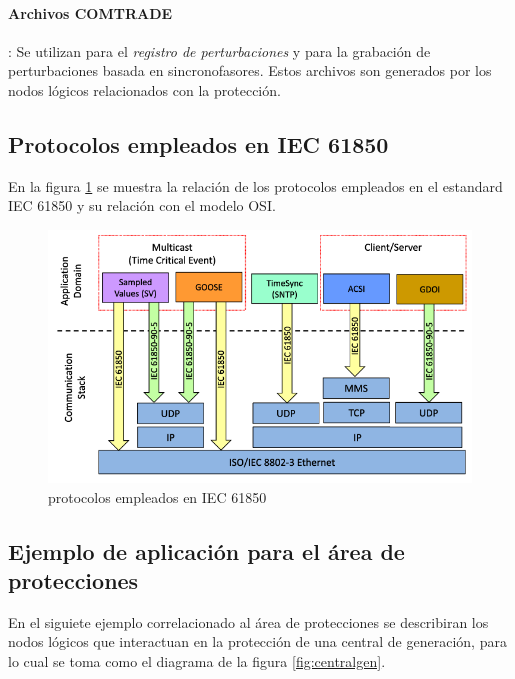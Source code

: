 \documentclass[a5paper]{book}%
\begin{document}
\paragraph{Archivos COMTRADE}: Se utilizan para el \textit{registro de perturbaciones} y para la grabación de perturbaciones basada en sincronofasores. Estos archivos son generados por los nodos lógicos relacionados con la protección.


\subsection{Protocolos empleados en IEC 61850}

En la figura \ref{fig:protocolosiec61850} se muestra la relación de los protocolos empleados en el estandard IEC 61850 y su relación con el modelo OSI.

\begin{figure}[H]
      \centering
      \caption{protocolos empleados en IEC 61850}
      \label{fig:protocolosiec61850}
      \includegraphics[width=0.7\linewidth]{cliente_servidor_61850}
    \end{figure}


\subsection{Ejemplo de aplicación para el área de protecciones}

    En el siguiete ejemplo correlacionado al área de protecciones se describiran los nodos lógicos que interactuan en la protección de una central de generación, para lo cual se toma como el diagrama de la figura \ref{fig:centralgen}.
\end{document}
